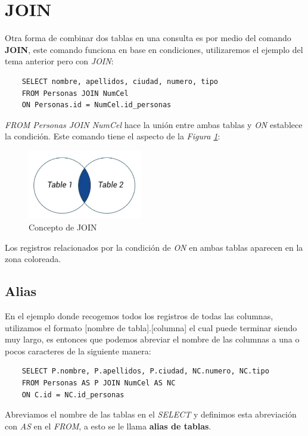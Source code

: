 \section{JOIN}

Otra forma de combinar dos tablas en una consulta es por medio del comando \textbf{JOIN}, este comando funciona en base en condiciones, utilizaremos el ejemplo del tema anterior pero con \textit{JOIN}:
\begin{lstlisting}
    SELECT nombre, apellidos, ciudad, numero, tipo
    FROM Personas JOIN NumCel
    ON Personas.id = NumCel.id_personas
\end{lstlisting}

\textit{FROM Personas JOIN NumCel} hace la unión entre ambas tablas y \textit{ON} establece la condición. Este comando tiene el aspecto de la \textit{Figura \ref{fig: 3}}:
\begin{figure}[H]
    \centering
    \caption{Concepto de JOIN}
    \label{fig: 3}
    \includegraphics[width=5cm]{ss/join.png}
\end{figure}

Los registros relacionados por la condición de \textit{ON} en ambas tablas aparecen en la zona coloreada.


\subsection{Alias}

En el ejemplo donde recogemos todos los registros de todas las columnas, utilizamos el formato [nombre de tabla].[columna] el cual puede terminar siendo muy largo, es entonces que podemos abreviar el nombre de las columnas a una o pocos caracteres de la siguiente manera:
\begin{lstlisting}
    SELECT P.nombre, P.apellidos, P.ciudad, NC.numero, NC.tipo
    FROM Personas AS P JOIN NumCel AS NC
    ON C.id = NC.id_personas
\end{lstlisting}

Abreviamos el nombre de las tablas en el \textit{SELECT} y definimos esta abreviación con \textit{AS} en el \textit{FROM}, a esto se le llama \textbf{alias de tablas}.


